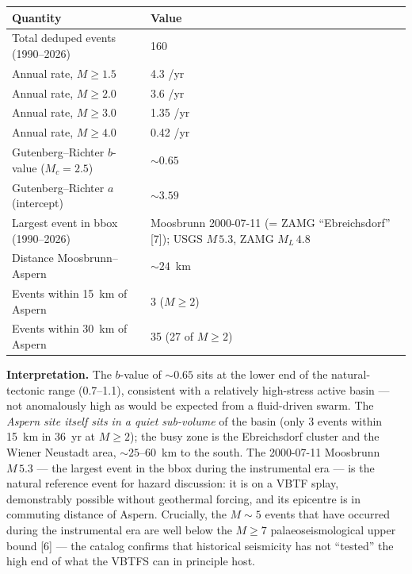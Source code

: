 \documentclass{article}
\begin{document}
\begin{center}
\begin{tabular}{ll}
\hline
\textbf{Quantity} & \textbf{Value} \\
\hline
Total deduped events (1990--2026)               & 160 \\
Annual rate, $M\geq 1.5$                         & 4.3 /yr \\
Annual rate, $M\geq 2.0$                         & 3.6 /yr \\
Annual rate, $M\geq 3.0$                         & 1.35 /yr \\
Annual rate, $M\geq 4.0$                         & 0.42 /yr \\
Gutenberg--Richter $b$-value ($M_c=2.5$)         & $\sim 0.65$ \\
Gutenberg--Richter $a$ (intercept)               & $\sim 3.59$ \\
Largest event in bbox (1990--2026)               & Moosbrunn 2000-07-11 (= ZAMG ``Ebreichsdorf'' [7]); USGS $M\,5.3$, ZAMG $M_L\,4.8$ \\
Distance Moosbrunn--Aspern                       & $\sim 24$~km \\
Events within 15~km of Aspern                    & 3 ($M\geq 2$) \\
Events within 30~km of Aspern                    & 35 (27 of $M\geq 2$) \\
\hline
\end{tabular}
\end{center}

\textbf{Interpretation.} The $b$-value of $\sim 0.65$ sits at the
lower end of the natural-tectonic range (0.7--1.1), consistent
with a relatively high-stress active basin --- not anomalously
high as would be expected from a fluid-driven swarm. The
\emph{Aspern site itself sits in a quiet sub-volume} of the basin
(only 3 events within 15~km in 36~yr at $M\geq 2$); the busy zone
is the Ebreichsdorf cluster and the Wiener Neustadt area, $\sim
25$--$60$~km to the south. The 2000-07-11 Moosbrunn $M\,5.3$ ---
the largest event in the bbox during the instrumental era ---
is the natural reference event for hazard discussion: it is on a
VBTF splay, demonstrably possible without geothermal forcing,
and its epicentre is in commuting distance of Aspern. Crucially,
the $M\sim 5$ events that have occurred during the instrumental
era are well below the $M\geq 7$ palaeoseismological upper bound
[6] --- the catalog confirms that historical seismicity has not
``tested'' the high end of what the VBTFS can in principle host.
\end{document}
